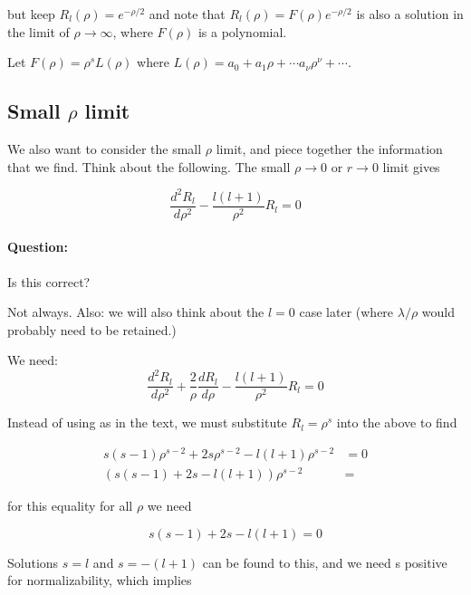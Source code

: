 but keep $R_l(\rho) = e^{-\rho/2}$ and note that $R_l(\rho) = F(\rho)e^{-\rho/2}$ is also a solution in the limit of $\rho \rightarrow \infty$, where $F(\rho)$ is a polynomial.

Let $F(\rho) = \rho^s L(\rho)$ where $L(\rho) = a_0 + a_1 \rho + \cdots a_\nu \rho^\nu + \cdots$.

\subsection{Small \texorpdfstring{$\rho$}{rho} limit}

We also want to consider the small $\rho$ limit, and piece together the information that we find.  Think about the following.  The small $\rho \rightarrow 0$ or $r \rightarrow 0$ limit gives

\begin{equation}\label{eqn:PHY356FLecture10:140}
\frac{d^2 R_l}{d\rho^2} - \frac{l(l+1)}{\rho^2} R_l = 0
\end{equation}

\paragraph{Question:} Is this correct?

Not always.  Also: we will also think about the $l=0$ case later (where $\lambda/\rho$ would probably need to be retained.)

We need:
\begin{equation}\label{eqn:PHY356FLecture10:140b}
\frac{d^2 R_l}{d\rho^2} + \frac{2}{\rho} \frac{d R_l}{d\rho} - \frac{l(l+1)}{\rho^2} R_l = 0
\end{equation}

Instead of using  as in the text, we must substitute $R_l = \rho^s$ into the above to find

\begin{align}\label{eqn:PHY356FLecture10:150}
s(s-1) \rho^{s-2} + 2 s \rho^{s-2} - l(l+1) \rho^{s-2} &= 0 \\
\left( s(s-1) + 2 s - l(l+1) \right) \rho^{s-2} &=
\end{align}

for this equality for all $\rho$ we need

\begin{equation}\label{eqn:PHY356FLecture10:160}
s(s-1) + 2 s - l(l+1) = 0
\end{equation}

Solutions $s = l$ and $s = -(l+1)$ can be found to this, and we need s positive for normalizability, which implies

